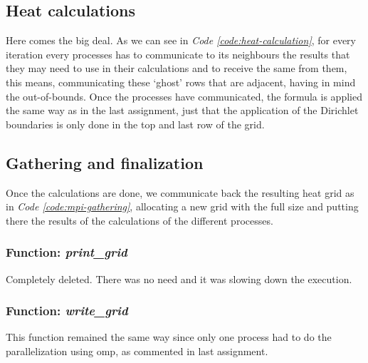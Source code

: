 \documentclass[../main.tex]{subfiles}
\begin{document}
\subsection{Heat calculations}

Here comes the big deal. As we can see in \textit{Code \ref{code:heat-calculation}}, for every iteration every processes has to communicate to its neighbours the results that they may need to use in their calculations and to receive the same from them, this means, communicating these `ghost' rows that are adjacent, having in mind the out-of-bounds. 
Once the processes have communicated, the formula is applied the same way as in the last assignment, just that the application of the Dirichlet boundaries is only done in the top and last row of the grid.


\subsection{Gathering and finalization}

Once the calculations are done, we communicate back the resulting heat grid as in \textit{Code \ref{code:mpi-gathering}}, allocating a new grid with the full size and putting there the results of the calculations of the different processes.

\subsubsection{Function: \textit{print\_grid}}

Completely deleted. There was no need and it was slowing down the execution.

\subsubsection{Function: \textit{write\_grid}}

This function remained the same way since only one process had to do the parallelization using \acrshort{omp}, as commented in last assignment.
\end{document}

